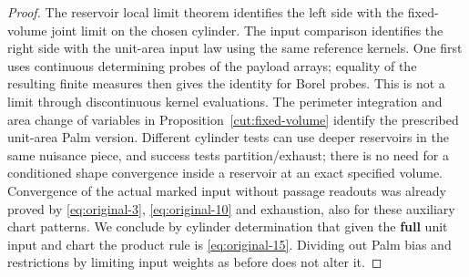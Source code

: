 \begin{proof}
The reservoir local limit theorem identifies the left side with the
fixed-volume joint limit on the chosen cylinder. The input comparison
identifies the right side with the unit-area input law using the same
reference kernels. One first uses continuous determining probes of the
payload arrays; equality of the resulting finite measures then gives the
identity for Borel probes. This is not a limit through discontinuous kernel
evaluations. The perimeter integration and area change of variables in
Proposition~\ref{cut:fixed-volume} identify the prescribed unit-area Palm
version.
Different cylinder tests can use deeper reservoirs
in the same nuisance piece, and success tests partition/exhaust; there is no need for a conditioned shape
convergence inside a reservoir at an exact specified volume. Convergence of the actual marked input without
passage readouts was already proved by \eqref{eq:original-3}, \eqref{eq:original-10} and exhaustion, also
for these auxiliary chart patterns. We conclude by cylinder determination that given the \textbf{full} unit
input and chart the product rule is \eqref{eq:original-15}. Dividing out Palm bias and restrictions by
limiting input weights as before does not alter it.

\end{proof}

